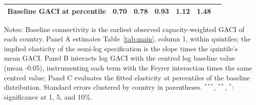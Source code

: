 \documentclass[12pt]{extarticle}
\begin{document}
\begin{table}[H]
{\begin{threeparttable}
\begin{tabular}{lcccccc}
  Baseline GACI at percentile & 0.70 & 0.78 & 0.93 & 1.12 & 1.48 & \\
\bottomrule
\end{tabular}
\begin{tablenotes}[flushleft]
\footnotesize
\item Notes: Baseline connectivity is the earliest observed capacity-weighted GACI of each country. Panel A estimates Table~\ref{tab:main}, column 1, within quintiles; the implied elasticity of the semi-log specification is the slope times the quintile's mean GACI. Panel B interacts log GACI with the centred log baseline value (mean -0.05), instrumenting each term with the Feyrer interaction times the same centred value; Panel C evaluates the fitted elasticity at percentiles of the baseline distribution. Standard errors clustered by country in parentheses. $^{***}$, $^{**}$, $^{*}$: significance at 1, 5, and 10\%.
\end{tablenotes}
\end{threeparttable}}
\end{table}
\end{document}
